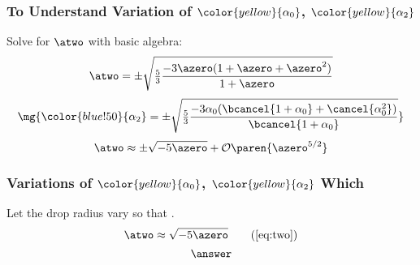 
\begin{frame}\frametitle{To Understand Variation of $\color{yellow}{\alpha_{0}}$, $\color{yellow}{\alpha_{2}}$}
Solve for $\atwo$ with basic algebra: \\
\begin{equation*}
	\atwo = \pm \sqrt{ \tfrac{5}{3} \frac{-3\azero(1 + \azero + \azero^{2})}{1 + \azero}} 
\end{equation*}
\begin{equation*}
	\mg{\color{blue!50}{\alpha_{2}} = \pm \sqrt{ \tfrac{5}{3} \frac{-3\alpha_{0}(\bcancel{1 + \alpha_{0}} + \cancel{\alpha_{0}^{2}})}{\bcancel{1 + \alpha_{0}}}} }
\end{equation*}
\begin{equation}
	\atwo \approx \pm \sqrt{-5 \azero} + \mathcal{O}\paren{\azero^{5/2}}
\label{eq:two}
\end{equation}
\end{frame}

\begin{frame}\frametitle{Variations of $\color{yellow}{\alpha_{0}}$, $\color{yellow}{\alpha_{2}}$ Which }
Let the drop radius vary so that .
\begin{equation}
	\atwo \approx \sqrt{-5 \azero}
\tag{\ref{eq:two}}
\end{equation}
\begin{equation}
	\answer
\label{eq:zero}
\end{equation}
\end{frame}


